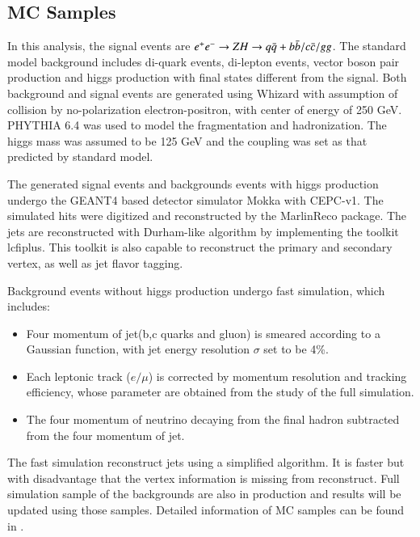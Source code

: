 \subsection{MC Samples}
In this analysis, the signal events are $e^+e^-\rightarrow Z H\rightarrow q\bar{q} + b\bar{b}/c\bar{c}/gg$. The standard model background includes di-quark events, di-lepton events, vector boson pair production and higgs production with final states different from the signal. Both background and signal events are generated using Whizard\cite{Wizard_1} with assumption of collision by no-polarization electron-positron, with center of energy of 250 GeV. PHYTHIA 6.4 \cite{PYTHIA64} was used to model the fragmentation and hadronization. The higgs mass was assumed to be 125 GeV and the coupling was set as that predicted by standard model.\par
The generated signal events and backgrounds events with higgs production undergo the GEANT4\cite{Geant4} based detector simulator Mokka\cite{mokka} with CEPC-v1. The simulated hits were digitized and reconstructed by the MarlinReco package. 
The jets are reconstructed with Durham-like algorithm\cite{Durham} by implementing the toolkit lcfiplus\cite{lcfiplus}. This toolkit is also capable to reconstruct the primary and secondary vertex, as well as jet flavor tagging.\par
Background events without higgs production undergo fast simulation, which includes:
\begin{itemize}
\item Four momentum of jet(b,c quarks and gluon) is smeared according to a Gaussian function, with jet energy  
resolution $\sigma$ set to be 4\%.
\item Each leptonic track ($e/\mu$) is corrected by momentum resolution and tracking efficiency, whose parameter are obtained from the study of the full simulation.
\item The four momentum of neutrino decaying from the final hadron subtracted from the four momentum of jet.
\end{itemize} 
The fast simulation reconstruct jets using a simplified algorithm. It is faster but with disadvantage that the vertex information is missing from reconstruct. Full simulation sample of the backgrounds are also in production and results will be updated using those samples. Detailed information of MC samples can be found in \cite{Samples}.
\clearpage